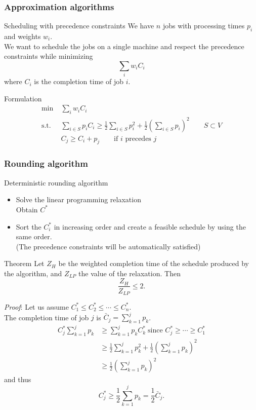 \documentclass[9pt,handout]{beamer}
\begin{document}
\begin{frame}
\frametitle{Approximation algorithms}
\begin{block}{Scheduling with precedence constraints}
We have $n$ jobs with processing times $p_i$ and weights $w_i$.\\
We want to schedule the jobs on a \alert{single machine} and
respect the \alert{precedence constraints} while minimizing
$$\sum_i w_i C_i$$
where $C_i$ is the \alert{completion time} of job $i$.
\end{block}
\begin{block}{Formulation}
\begin{align*}
\min\; & \sum_i w_i C_i\\
\text{s.t. }\;& \sum_{i\in S} p_i C_i \geq \frac{1}{2} \sum_{i\in S} p_i^2 +\frac{1}{2}
\left( \sum_{i\in S} p_i\right)^2\qquad S\subset V\\
&C_j \geq C_i + p_j \qquad \text{if } i \text{ precedes } j
\end{align*}
\end{block}
\end{frame}
\begin{frame}
\frametitle{Rounding algorithm }
\begin{block}{Deterministic rounding algorithm}
\begin{itemize}
\item<1-> \alert{Solve} the linear programming relaxation\\
Obtain $C^*$
\item<1-> \alert{Sort} the $C_i^*$ in increasing order and create 
a feasible schedule by using the \alert{same order}.\\
(The precedence constraints will be automatically satisfied)
\end{itemize}
\end{block}
\begin{block}{Theorem}
Let $Z_H$ be the weighted completion time  of the schedule produced by the
algorithm, and $Z_{LP}$ the value of the relaxation. Then
$$\frac{Z_H}{Z_{LP}}\leq 2.$$
\end{block}
\end{frame}
\begin{frame}
\textit{Proof}:
Let us assume $C^*_1 \leq C^*_2 \leq \cdots \leq C^*_n$.\\
The completion time of job $j$ is $\bar C_j=\sum_{k=1}^j p_k$.
\begin{align*}
C_j^*\sum_{k=1}^j p_k &\geq \sum_{k=1}^j p_k C_k^* \; \text{since } C_j^*\geq \cdots \geq C_1^*\\
&\geq \frac{1}{2} \sum_{k=1}^j p_k^2 + \frac{1}{2} \left( \sum_{k=1}^j p_k \right)^2\\
&\geq \frac{1}{2} \left( \sum_{k=1}^j p_k \right)^2
\end{align*}
and thus
$$C_j^* \geq \frac{1}{2} \sum_{k=1}^j p_k =\frac{1}{2} \bar C_j.$$
\end{frame}
\end{document}
